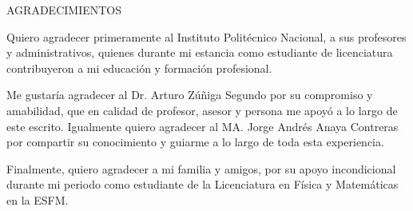 \begin{center}
  \textsc{\LARGE A\hspace{0.3cm}G\hspace{0.3cm}R\hspace{0.3cm}A\hspace{0.3cm}D\hspace{0.3cm}E\hspace{0.3cm}C\hspace{0.3cm}I\hspace{0.3cm}M\hspace{0.3cm}I\hspace{0.3cm}E\hspace{0.3cm}N\hspace{0.3cm}T\hspace{0.3cm}O\hspace{0.3cm}S}\\[2cm]
\end{center}

Quiero agradecer primeramente al Instituto Politécnico Nacional, a sus profesores y administrativos, quienes durante mi estancia como estudiante de licenciatura contribuyeron a mi educación y formación profesional.

Me gustaría agradecer al Dr. Arturo Zúñiga Segundo por su compromiso y amabilidad, que en calidad de profesor, asesor y persona me apoyó a lo largo de este escrito. Igualmente quiero agradecer al MA. Jorge Andrés Anaya Contreras por compartir su conocimiento y guiarme a lo largo de toda esta experiencia.

Finalmente, quiero agradecer a mi familia y amigos, por su apoyo incondicional durante mi periodo como estudiante de la Licenciatura en Física y Matemáticas en la ESFM.



